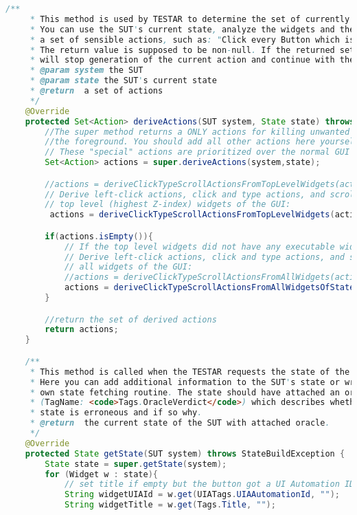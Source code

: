 \begin{lstlisting}[language=java, basicstyle=\tiny, caption=Protocol for the real world application, label=code:real-world-app-protocol]
    /**
     * This method is used by TESTAR to determine the set of currently available actions.
     * You can use the SUT's current state, analyze the widgets and their properties to create
     * a set of sensible actions, such as: "Click every Button which is enabled" etc.
     * The return value is supposed to be non-null. If the returned set is empty, TESTAR
     * will stop generation of the current action and continue with the next one.
     * @param system the SUT
     * @param state the SUT's current state
     * @return  a set of actions
     */
    @Override
    protected Set<Action> deriveActions(SUT system, State state) throws ActionBuildException{
        //The super method returns a ONLY actions for killing unwanted processes if needed, or bringing the SUT to
        //the foreground. You should add all other actions here yourself.
        // These "special" actions are prioritized over the normal GUI actions in selectAction() / preSelectAction().
        Set<Action> actions = super.deriveActions(system,state);

        //actions = deriveClickTypeScrollActionsFromTopLevelWidgets(actions, state).getAvailableActions();
        // Derive left-click actions, click and type actions, and scroll actions from
        // top level (highest Z-index) widgets of the GUI:
         actions = deriveClickTypeScrollActionsFromTopLevelWidgets(actions, system, state);

        if(actions.isEmpty()){
            // If the top level widgets did not have any executable widgets, try all widgets:
            // Derive left-click actions, click and type actions, and scroll actions from
            // all widgets of the GUI:
            //actions = deriveClickTypeScrollActionsFromAllWidgets(actions, state).getAvailableActions();
            actions = deriveClickTypeScrollActionsFromAllWidgetsOfState(actions, system, state);
        }

        //return the set of derived actions
        return actions;
    }

    /**
     * This method is called when the TESTAR requests the state of the SUT.
     * Here you can add additional information to the SUT's state or write your
     * own state fetching routine. The state should have attached an oracle
     * (TagName: <code>Tags.OracleVerdict</code>) which describes whether the
     * state is erroneous and if so why.
     * @return  the current state of the SUT with attached oracle.
     */
    @Override
    protected State getState(SUT system) throws StateBuildException {
        State state = super.getState(system);
        for (Widget w : state){
            // set title if empty but the button got a UI Automation ID
            String widgetUIAId = w.get(UIATags.UIAAutomationId, "");
            String widgetTitle = w.get(Tags.Title, "");


\end{lstlisting}
